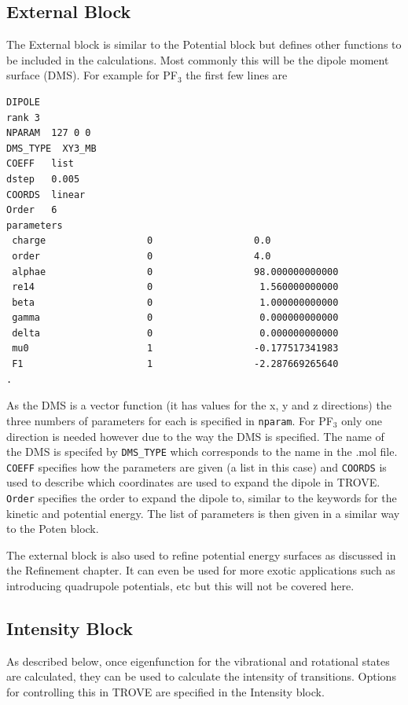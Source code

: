 \subsection{External Block}
The External block is similar to the Potential block but defines other functions to be included in the calculations. Most 
commonly this will be the dipole moment surface (DMS). For example for 
PF$_3$ the first few lines are 
\begin{verbatim}
DIPOLE
rank 3
NPARAM  127 0 0
DMS_TYPE  XY3_MB
COEFF   list
dstep   0.005
COORDS  linear
Order   6
parameters
 charge                  0                  0.0
 order                   0                  4.0
 alphae                  0                  98.000000000000
 re14                    0                   1.560000000000
 beta                    0                   1.000000000000
 gamma                   0                   0.000000000000
 delta                   0                   0.000000000000
 mu0                     1                  -0.177517341983
 F1                      1                  -2.287669265640
.
\end{verbatim}
As the DMS is a vector function (it has values for the x, y and z directions) the three numbers of parameters 
for each is specified in \verb|nparam|. For PF$_3$ only one direction is needed however due to the way the DMS is specified.
The name of the DMS is specifed by \verb|DMS_TYPE| which corresponds to the name in the .mol file.
\verb|COEFF| specifies how the parameters are given (a list in this case) 
and \verb|COORDS| is used to describe which coordinates are used to expand the dipole in TROVE. \verb|Order| specifies
the order to expand the dipole to, similar to the keywords for the kinetic and potential energy.
The list of parameters is then given in a similar way to the Poten block. 

The external block is also used to refine potential energy surfaces as discussed in the Refinement chapter. It can 
even be used for more exotic applications such as introducing quadrupole potentials, etc but this will not be 
covered here.


\subsection{Intensity Block}
As described below, once eigenfunction for the vibrational and rotational states are calculated, 
they can be used to calculate the intensity of transitions.
Options for controlling this in TROVE are specified in the Intensity block. 

